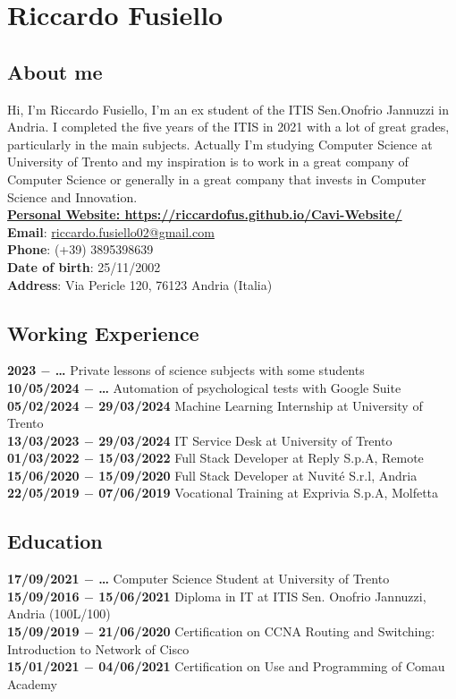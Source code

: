 \documentclass[12pt]{article}
\begin{document}
\section*{Riccardo Fusiello}\subsection*{About me}
Hi, I'm Riccardo Fusiello, I'm an ex student of the ITIS Sen.Onofrio Jannuzzi in Andria. I completed the five years of the ITIS in 2021 with a lot of great grades, particularly in the main subjects. Actually I'm studying Computer Science at University of Trento and my inspiration is to work in a great company of Computer Science or generally in a great company that invests in Computer Science and Innovation.\\
\href{https://riccardofus.github.io/Cavi-Website/}{\textbf{Personal Website: https://riccardofus.github.io/Cavi-Website/}}\\
\textbf{Email}: \href{mailto:riccardo.fusiello02@gmail.com}{riccardo.fusiello02@gmail.com}\\
\textbf{Phone}: (+39) 3895398639\\
\textbf{Date of birth}: 25/11/2002\\
\textbf{Address}: Via Pericle 120, 76123 Andria (Italia)
\subsection*{Working Experience}
\textbf{2023 $-$ \dots} Private lessons of science subjects with some students\\
\textbf{10/05/2024 $-$ \dots} Automation of psychological tests with Google Suite\\
\textbf{05/02/2024 $-$ 29/03/2024} Machine Learning Internship at University of Trento\\
\textbf{13/03/2023 $-$ 29/03/2024} IT Service Desk at University of Trento\\
\textbf{01/03/2022 $-$ 15/03/2022} Full Stack Developer at Reply S.p.A, Remote\\
\textbf{15/06/2020 $-$ 15/09/2020} Full Stack Developer at Nuvité S.r.l, Andria \\
\textbf{22/05/2019 $-$ 07/06/2019} Vocational Training at Exprivia S.p.A, Molfetta
\subsection*{Education}
\textbf{17/09/2021 $-$ \dots} Computer Science Student at University of Trento\\
\textbf{15/09/2016 $-$ 15/06/2021} Diploma in IT at ITIS Sen. Onofrio Jannuzzi, Andria (100L/100)\\
\textbf{15/09/2019 $-$ 21/06/2020} Certification on CCNA Routing and Switching: Introduction to Network of Cisco\\
\textbf{15/01/2021 $-$ 04/06/2021} Certification on Use and Programming of Comau Academy
\end{document}
